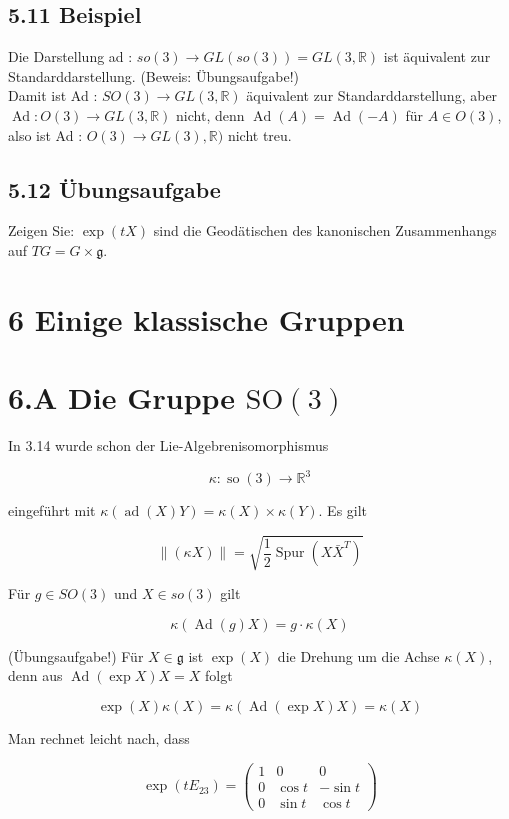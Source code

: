 \documentclass[10pt, letterpaper]{article}
\begin{document}
\subsection*{5.11 Beispiel}
Die Darstellung ad : $s o(3) \rightarrow G L(s o(3))=G L(3, \mathbb{R})$ ist äquivalent zur Standarddarstellung. (Beweis: Übungsaufgabe!)\\
Damit ist Ad : $S O(3) \rightarrow G L(3, \mathbb{R})$ äquivalent zur Standarddarstellung, aber $\operatorname{Ad}: O(3) \rightarrow G L(3, \mathbb{R})$ nicht, denn $\operatorname{Ad}(A)=\operatorname{Ad}(-A)$ für $A \in O(3)$, also ist Ad : $O(3) \rightarrow G L(3), \mathbb{R})$ nicht treu.

\subsection*{5.12 Übungsaufgabe}
Zeigen Sie: $\exp (t X)$ sind die Geodätischen des kanonischen Zusammenhangs auf $T G=G \times \mathfrak{g}$.

\section*{6 Einige klassische Gruppen}
\section*{6.A Die Gruppe $\mathrm{SO}(3)$}
In 3.14 wurde schon der Lie-Algebrenisomorphismus

$$
\kappa: \operatorname{so}(3) \rightarrow \mathbb{R}^{3}
$$

eingeführt mit $\kappa(\operatorname{ad}(X) Y)=\kappa(X) \times \kappa(Y)$. Es gilt

$$
\|(\kappa X)\|=\sqrt{\frac{1}{2} \operatorname{Spur}\left(X \bar{X}^{T}\right)}
$$

Für $g \in S O(3)$ und $X \in s o(3)$ gilt

$$
\kappa(\operatorname{Ad}(g) X)=g \cdot \kappa(X)
$$

(Übungsaufgabe!) Für $X \in \mathfrak{g}$ ist $\exp (X)$ die Drehung um die Achse $\kappa(X)$, denn aus $\operatorname{Ad}(\exp X) X=X$ folgt

$$
\exp (X) \kappa(X)=\kappa(\operatorname{Ad}(\exp X) X)=\kappa(X)
$$

Man rechnet leicht nach, dass

$$
\exp \left(t E_{23}\right)=\left(\begin{array}{ccc}
1 & 0 & 0 \\
0 & \cos t & -\sin t \\
0 & \sin t & \cos t
\end{array}\right)
$$
\end{document}
